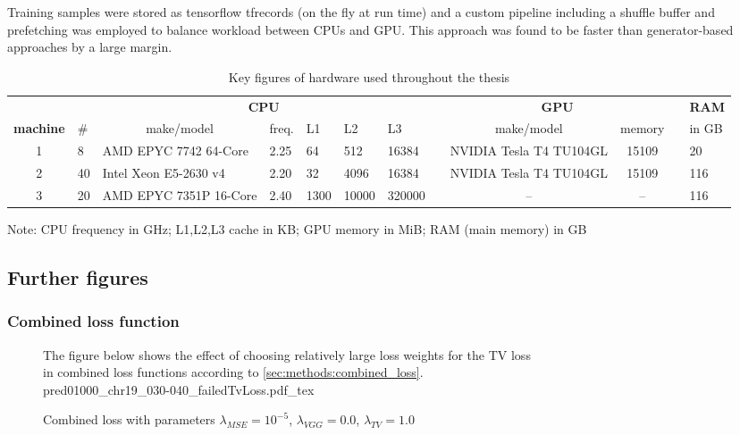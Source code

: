 \begin{landscape}
Training samples were stored as tensorflow tfrecords (on the fly at run time) and a custom pipeline including a shuffle buffer and prefetching 
was employed to balance workload between CPUs and GPU.
This approach was found to be faster than generator-based approaches by a large margin.
 \begin{table}[hbp]
\small
\centering
\begin{tabular}{c|lllllllccll}
\hline
\textbf{}        &    & \multicolumn{5}{c}{\textbf{CPU}}                               &  & \multicolumn{2}{c}{\textbf{GPU}} &  & \multicolumn{1}{c}{\textbf{RAM}} \\
\textbf{machine} & \# & \multicolumn{1}{c}{make/model} & freq. & L1   & L2    & L3     &  & make/model              & memory &  & in GB                            \\ \hline
1                & 8  & AMD EPYC 7742 64-Core          & 2.25  & 64   & 512   & 16384  &  & NVIDIA Tesla T4 TU104GL & 15109  &  & 20                               \\
2                & 40 & Intel Xeon E5-2630 v4          & 2.20  & 32   & 4096  & 16384  &  & NVIDIA Tesla T4 TU104GL & 15109  &  & 116                              \\
3                & 20 & AMD EPYC 7351P 16-Core         & 2.40  & 1300 & 10000 & 320000 &  & --                      & --     &  & 116                              \\ \hline
\end{tabular}
\caption{Key figures of hardware used throughout the thesis}\label{tab:appendix:hardware}
\end{table}
Note: CPU frequency in GHz; L1,L2,L3 cache in KB; GPU memory in MiB; RAM (main memory) in GB
\end{landscape}

\subsection{Further figures}
\subsubsection{Combined loss function}
\begin{figure}[htbp]
    \centering
    \scriptsize
    \raggedright{The figure below shows the effect of choosing relatively large loss weights for the TV loss\\in combined loss functions according to \cref{sec:methods:combined_loss}.\\[2mm]}
    {pred01000_chr19_030-040_failedTvLoss.pdf_tex}
    \caption{Combined loss with parameters $\lambda_\mathit{MSE}=10^{-5}$, $\lambda_\mathit{VGG}=0.0$, $\lambda_\mathit{TV}=1.0$}
    \label{fig:appendix:failed_tv_loss}
\end{figure}
\clearpage

